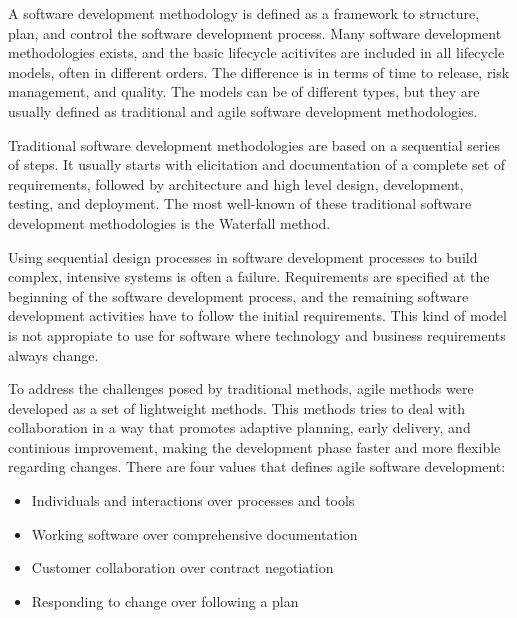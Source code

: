 A software development methodology is defined as a framework to structure, plan, and control the software development process. Many software development methodologies exists, and the basic lifecycle acitivites are included in all lifecycle models, often in different orders. The difference is in terms of time to release, risk management, and quality. The models can be of different types, but they are usually defined as traditional and agile software development methodologies.

Traditional software development methodologies are based on a sequential series of steps. It usually starts with elicitation and documentation of a complete set of requirements, followed by architecture and high level design, development, testing, and deployment. The most well-known of these traditional software development methodologies is the Waterfall method.

Using sequential design processes in software development processes to build complex, intensive systems is often a failure\cite{p50-allman}. Requirements are specified at the beginning of the software development process, and the remaining software development activities have to follow the initial requirements. This kind of model is not appropiate to use for software where technology and business requirements always change. 


To address the challenges posed by traditional methods, agile methods were developed as a set of lightweight methods. This methods tries to deal with collaboration in a way that promotes adaptive planning, early delivery, and continious improvement, making the development phase faster and more flexible regarding changes. There are four values that defines agile software development: 

\begin{itemize}
	\item Individuals and interactions over processes and tools
	\item Working software over comprehensive documentation
	\item Customer collaboration over contract negotiation
	\item Responding to change over following a plan
\end{itemize}

